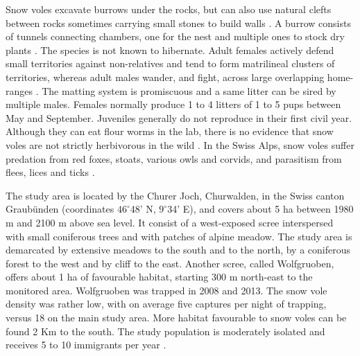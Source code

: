 Snow voles excavate burrows under the rocks, but can also use natural clefts between rocks sometimes carrying small stones to build walls \parencite{Niederer2008}. A burrow consists of tunnels connecting chambers, one for the nest and multiple ones to stock dry plants \parencite{Janeau1997}. The species is not known to hibernate. 
Adult females actively defend small territories against non-relatives and tend to form matrilineal clusters of territories, whereas adult males wander, and fight, across large overlapping home-ranges \parencite{Luque-larena2004, Garcia-Navas2016}. The matting system is promiscuous and a same litter can be sired by multiple males. Females normally produce 1 to 4 litters of 1 to 5 pups between May and September. Juveniles generally do not reproduce in their first civil year. 
Although they can eat flour worms in the lab, there is no evidence that snow voles are not strictly herbivorous in the wild \parencite{Janeau1997}. In the Swiss Alps, snow voles suffer predation from red foxes, stoats, various owls and corvids, and parasitism from flees, lices and ticks \parencite{Janeau1997, Martinoli2001}.

The study area is located by the Churer Joch, Churwalden, in the Swiss canton Graub\"unden (coordinates $46^{\circ}$48' N, $9^{\circ}$34' E), and covers about 5 ha between 1980 m and 2100 m above sea level. It consist of a west-exposed scree interspersed with small coniferous trees and with patches of alpine meadow. The study area is demarcated by extensive meadows to the south and to the north, by a coniferous forest to the west and by cliff to the east. Another scree, called Wolfgruoben, offers about 1 ha of favourable habitat, starting 300 m north-east to the monitored area. Wolfgruoben was trapped in 2008 and 2013. The snow vole density was rather low, with on average five captures per night of trapping, versus 18 on the main study area. More habitat favourable to snow voles can be found 2 Km to the south. The study population is moderately isolated and receives 5 to 10 immigrants per year \parencite{Garcia-Navas2016}. 

